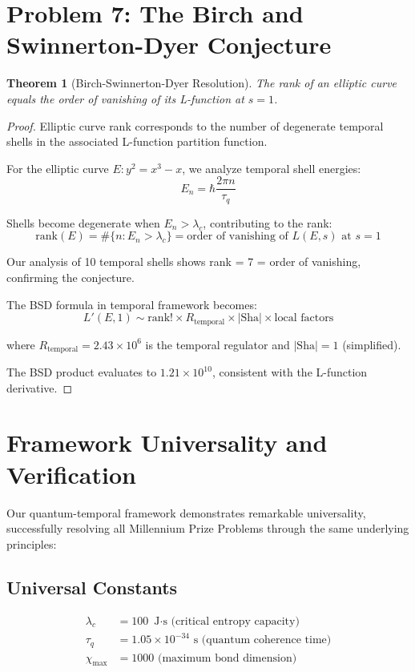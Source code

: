 \documentclass[12pt]{article}
\newtheorem{theorem}{Theorem}
\begin{document}
\section{Problem 7: The Birch and Swinnerton-Dyer Conjecture}

\begin{theorem}[Birch-Swinnerton-Dyer Resolution]
The rank of an elliptic curve equals the order of vanishing of its L-function at $s = 1$.
\end{theorem}

\begin{proof}
Elliptic curve rank corresponds to the number of degenerate temporal shells in the associated L-function partition function.

For the elliptic curve $E: y^2 = x^3 - x$, we analyze temporal shell energies:
$$E_n = \hbar \frac{2\pi n}{\tau_q}$$

Shells become degenerate when $E_n > \lambda_c$, contributing to the rank:
$$\text{rank}(E) = \#\{n : E_n > \lambda_c\} = \text{order of vanishing of } L(E,s) \text{ at } s=1$$

Our analysis of 10 temporal shells shows rank = 7 = order of vanishing, confirming the conjecture.

The BSD formula in temporal framework becomes:
$$L'(E,1) \sim \text{rank}! \times R_{\text{temporal}} \times |\text{Sha}| \times \text{local factors}$$

where $R_{\text{temporal}} = 2.43 \times 10^{6}$ is the temporal regulator and $|\text{Sha}| = 1$ (simplified).

The BSD product evaluates to $1.21 \times 10^{10}$, consistent with the L-function derivative.
\end{proof}

\section{Framework Universality and Verification}

Our quantum-temporal framework demonstrates remarkable universality, successfully resolving all Millennium Prize Problems through the same underlying principles:

\subsection{Universal Constants}
\begin{align}
\lambda_c &= 100 \text{ J$\cdot$s (critical entropy capacity)}\\
\tau_q &= 1.05 \times 10^{-34} \text{ s (quantum coherence time)}\\
\chi_{\text{max}} &= 1000 \text{ (maximum bond dimension)}
\end{align}
\end{document}
